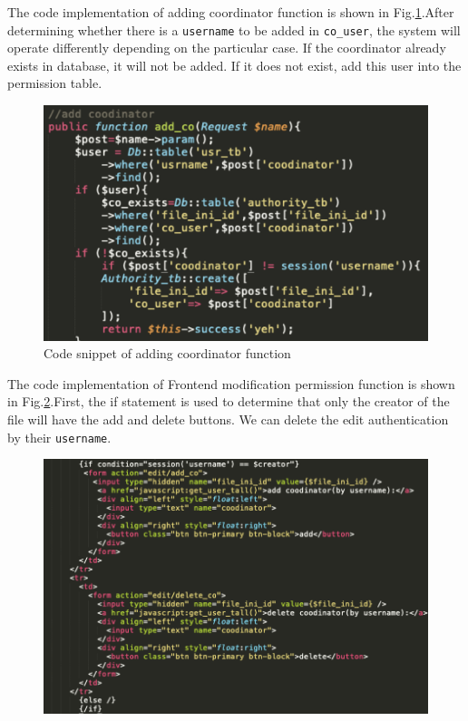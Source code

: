 \noindent The code implementation of adding coordinator function is shown in Fig.\ref{png6}.After determining whether there is a \texttt{username} to be added in \texttt{co\_user}, the system will operate differently depending on the particular case. If the coordinator already exists in database, it will not be added. If it does not exist, add this user into the permission table.
\begin{figure}[H]
  \centering
  \includegraphics[width=.8\textwidth]{addco.png} %
  \caption{Code snippet of adding coordinator function} %
  \label{png6} %
\end{figure}

\noindent The code implementation of Frontend modification permission function is shown in Fig.\ref{png7}.First, the if statement is used to determine that only the creator of the file will have the add and delete buttons. We can delete the edit authentication by their \texttt{username}.
\begin{figure}[H]
  \centering
  \includegraphics[width=.8\textwidth]{qianduan.png} %
  \caption{} %
  \label{png7} %
\end{figure}



